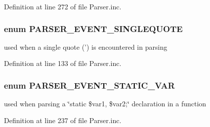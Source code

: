 \-Definition at line 272 of file \-Parser.\-inc.

\hypertarget{_parser_8inc_a600090b20e4c80c2a5b96117f091191c}{
\subsubsection[{\-P\-A\-R\-S\-E\-R\-\_\-\-E\-V\-E\-N\-T\-\_\-\-S\-I\-N\-G\-L\-E\-Q\-U\-O\-T\-E}]{\setlength{\rightskip}{0pt plus 5cm}enum {\bf \-P\-A\-R\-S\-E\-R\-\_\-\-E\-V\-E\-N\-T\-\_\-\-S\-I\-N\-G\-L\-E\-Q\-U\-O\-T\-E}}}\label{_parser_8inc_a600090b20e4c80c2a5b96117f091191c}
used when a single quote (') is encountered in parsing 

\-Definition at line 133 of file \-Parser.\-inc.

\hypertarget{_parser_8inc_a415d6a7a4ac5da7fc9b37c00574d71bd}{
\subsubsection[{\-P\-A\-R\-S\-E\-R\-\_\-\-E\-V\-E\-N\-T\-\_\-\-S\-T\-A\-T\-I\-C\-\_\-\-V\-A\-R}]{\setlength{\rightskip}{0pt plus 5cm}enum {\bf \-P\-A\-R\-S\-E\-R\-\_\-\-E\-V\-E\-N\-T\-\_\-\-S\-T\-A\-T\-I\-C\-\_\-\-V\-A\-R}}}\label{_parser_8inc_a415d6a7a4ac5da7fc9b37c00574d71bd}
used when parsing a \char`\"{}static \$var1, \$var2;\char`\"{} declaration in a function 

\-Definition at line 237 of file \-Parser.\-inc.

